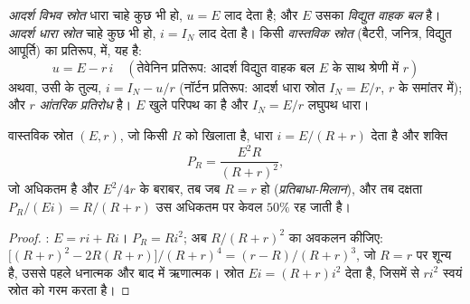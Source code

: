 \begin{definition}[आदर्श और वास्तविक स्रोत]\label{def:b1:dc-circuits:sources}
\emph{आदर्श विभव स्रोत} धारा चाहे कुछ भी हो, $u = E$ लाद देता है; और
$E$ उसका \emph{विद्युत वाहक बल} है। \emph{आदर्श धारा स्रोत}
 चाहे कुछ भी हो, $i = I_N$ लाद देता है। किसी \emph{वास्तविक स्रोत}
(बैटरी, जनित्र, विद्युत आपूर्ति) का प्रतिरूप,  में, यह है:
\[
u = E - r\,i \quad (\text{तेवेनिन प्रतिरूप: आदर्श विद्युत वाहक बल } E \text{ के साथ श्रेणी में } r)
\]
अथवा, उसी के तुल्य, $i = I_N - u/r$ (नॉर्टन प्रतिरूप: आदर्श धारा
स्रोत $I_N = E/r$, $r$ के समांतर में); और $r$ \emph{आंतरिक
प्रतिरोध} है। $E$ खुले परिपथ का  है और $I_N = E/r$
लघुपथ धारा।
\end{definition}

\begin{proposition}[किसी वास्तविक स्रोत का शक्ति-लेखा]\label{prop:b1:dc-circuits:sourcepower}
वास्तविक स्रोत $(E, r)$, जो किसी  $R$ को खिलाता है, धारा
$i = E/(R + r)$ देता है और शक्ति
\[
P_R = \frac{E^2 R}{(R + r)^2},
\]
जो अधिकतम है और $E^2/4r$ के बराबर, तब जब $R = r$ हो
(\emph{प्रतिबाधा-मिलान}), और तब दक्षता $P_R/(Ei) = R/(R + r)$ उस अधिकतम पर केवल $50\%$ रह जाती है।
\end{proposition}

\begin{proof}
: $E = ri + Ri$। $P_R = Ri^2$; अब $R/(R + r)^2$ का अवकलन कीजिए:
$\big[(R + r)^2 - 2R(R + r)\big]/(R + r)^4 = (r - R)/(R + r)^3$, जो
$R = r$ पर शून्य है, उससे पहले धनात्मक और बाद में ऋणात्मक। स्रोत
$Ei = (R + r)i^2$ देता है, जिसमें से $ri^2$ स्वयं स्रोत को गरम करता है।
\end{proof}

